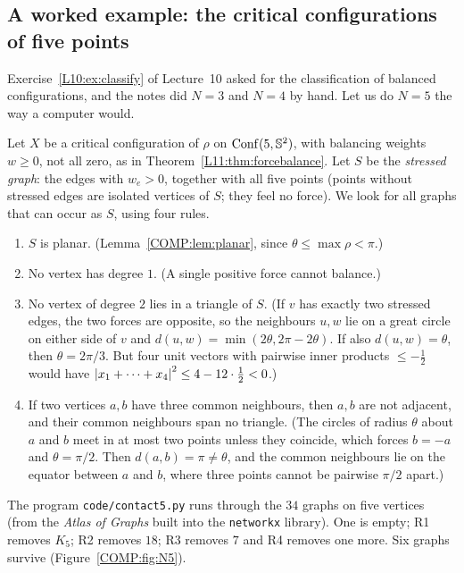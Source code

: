 \subsection{A worked example: the critical configurations of five points}
Exercise~\ref{L10:ex:classify} of Lecture~10 asked for the classification of balanced configurations,
and the notes did $N=3$ and $N=4$ by hand. Let us do $N=5$ the way a computer would.

Let $X$ be a critical configuration of $\rho$ on $\operatorname{Conf}(5,\mathbb{S}^2)$, with balancing weights $w\ge0$, not
all zero, as in Theorem~\ref{L11:thm:forcebalance}. Let $S$ be the \emph{stressed graph}: the edges with
$w_e>0$, together with all five points (points without stressed edges are isolated vertices of $S$;
they feel no force). We look for all graphs that can occur as $S$, using four rules.
\begin{enumerate}[label=\textbf{R\arabic*},leftmargin=*]
\item $S$ is planar. (Lemma~\ref{COMP:lem:planar}, since $\theta\le\max\rho<\pi$.)
\item No vertex has degree $1$. (A single positive force cannot balance.)
\item No vertex of degree $2$ lies in a triangle of $S$. (If $v$ has exactly two stressed edges, the two
  forces are opposite, so the neighbours $u,w$ lie on a great circle on either side of $v$ and
  $d(u,w)=\min(2\theta,2\pi-2\theta)$. If also $d(u,w)=\theta$, then $\theta=2\pi/3$. But four unit vectors
  with pairwise inner products $\le-\frac12$ would have $\left\lvert x_1+\dots+x_4 \right\rvert^2\le4-12\cdot\frac12<0$.)
\item If two vertices $a,b$ have three common neighbours, then $a,b$ are not adjacent, and their
  common neighbours span no triangle. (The circles of radius $\theta$ about $a$ and $b$ meet in at most two
  points unless they coincide, which forces $b=-a$ and $\theta=\pi/2$. Then $d(a,b)=\pi\ne\theta$, and the
  common neighbours lie on the equator between $a$ and $b$, where three points cannot be pairwise
  $\pi/2$ apart.)
\end{enumerate}
The program \texttt{code/contact5.py} runs through the $34$ graphs on five vertices (from the
\emph{Atlas of Graphs} built into the \texttt{networkx} library). One is empty; R1 removes $K_5$; R2 removes $18$;
R3 removes $7$ and R4 removes one more. Six graphs survive (Figure~\ref{COMP:fig:N5}).

